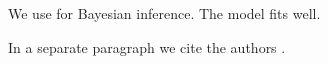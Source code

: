 \documentclass[article]{jss}
\begin{document}
We use  for Bayesian inference. The model fits well.

In a separate paragraph we cite the authors \citep{Stan:2024}.
\end{document}
